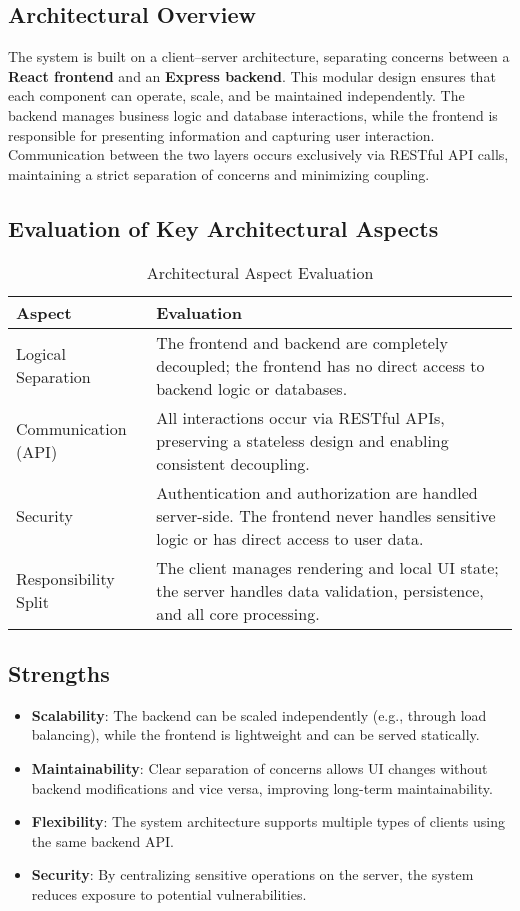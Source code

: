 \subsection{Architectural Overview}
The system is built on a client–server architecture, separating concerns between a \textbf{React frontend} and an \textbf{Express backend}. This modular design ensures that each component can operate, scale, and be maintained independently. The backend manages business logic and database interactions, while the frontend is responsible for presenting information and capturing user interaction. Communication between the two layers occurs exclusively via RESTful API calls, maintaining a strict separation of concerns and minimizing coupling.

\subsection{Evaluation of Key Architectural Aspects}

\begin{table}[H]
\centering
\begin{tabularx}{\linewidth}{|l|X|}
\hline
\textbf{Aspect} & \textbf{Evaluation} \\
\hline
Logical Separation & The frontend and backend are completely decoupled; the frontend has no direct access to backend logic or databases. \\
\hline
Communication (API) & All interactions occur via RESTful APIs, preserving a stateless design and enabling consistent decoupling. \\
\hline
Security & Authentication and authorization are handled server-side. The frontend never handles sensitive logic or has direct access to user data. \\
\hline
Responsibility Split & The client manages rendering and local UI state; the server handles data validation, persistence, and all core processing. \\
\hline
\end{tabularx}
\caption{Architectural Aspect Evaluation}
\end{table}

\subsection{Strengths}
\begin{itemize}
    \item \textbf{Scalability}: The backend can be scaled independently (e.g., through load balancing), while the frontend is lightweight and can be served statically.
    \item \textbf{Maintainability}: Clear separation of concerns allows UI changes without backend modifications and vice versa, improving long-term maintainability.
    \item \textbf{Flexibility}: The system architecture supports multiple types of clients using the same backend API.
    \item \textbf{Security}: By centralizing sensitive operations on the server, the system reduces exposure to potential vulnerabilities.
\end{itemize}

